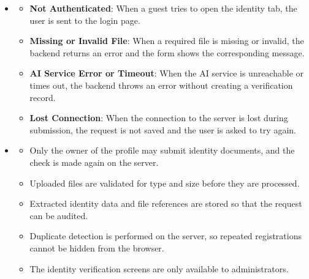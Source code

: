 \begin{itemize}[leftmargin=1.6em,topsep=4pt,itemsep=3pt,parsep=0pt,label=$\bullet$]
        \begin{itemize}[leftmargin=2.2em,topsep=2pt,itemsep=3pt,parsep=0pt,label=$\circ$]
            \item On AI \texttt{VERIFIED} without duplicates, a verification record is stored with status \texttt{PENDING} alongside \texttt{aiSummary} and \texttt{aiSelfieSummary}.
            \item On AI \texttt{REJECTED}/\texttt{RETRY} or duplicate detection, a verification record is stored with status \texttt{REJECTED} (and \texttt{duplicateOfId} when applicable).
            \item The administrator can review, approve or reject pending requests from the identity verification screen.
            \item The user can see the current status of the request from the Identity tab.
        \end{itemize}
    \item {}
        \begin{itemize}[leftmargin=2.2em,topsep=2pt,itemsep=3pt,parsep=0pt,label=$\circ$]
            \item \textbf{Not Authenticated}: When a guest tries to open the identity tab, the user is sent to the login page.
            \item \textbf{Missing or Invalid File}: When a required file is missing or invalid, the backend returns an error and the form shows the corresponding message.
            \item \textbf{AI Service Error or Timeout}: When the AI service is unreachable or times out, the backend throws an error without creating a verification record.
            \item \textbf{Lost Connection}: When the connection to the server is lost during submission, the request is not saved and the user is asked to try again.
        \end{itemize}
    \item {}
        \begin{itemize}[leftmargin=2.2em,topsep=2pt,itemsep=3pt,parsep=0pt,label=$\circ$]
            \item Only the owner of the profile may submit identity documents, and the check is made again on the server.
            \item Uploaded files are validated for type and size before they are processed.
            \item Extracted identity data and file references are stored so that the request can be audited.
            \item Duplicate detection is performed on the server, so repeated registrations cannot be hidden from the browser.
            \item The identity verification screens are only available to administrators.
        \end{itemize}
\end{itemize}
